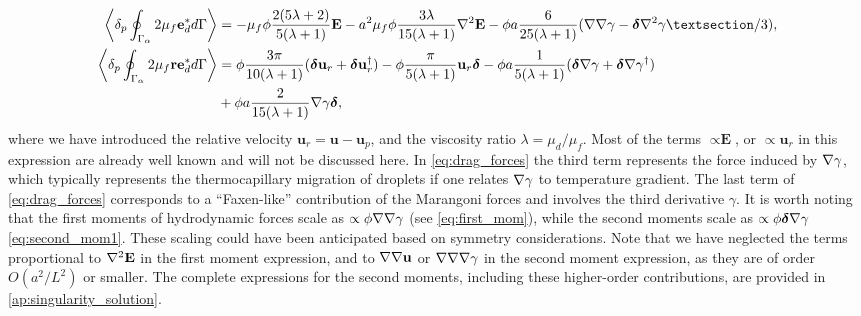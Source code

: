 \begin{align}
    \pSavg{ 2\mu_f \textbf{e}_d^*}
    &=
    -  \mu_f \phi \frac{2(5\lambda +2)}{5(\lambda+1)}\textbf{E}
    -  a^2 \mu_f \phi \frac{3\lambda}{15(\lambda+1)}\grad^2  \textbf{E}
    - \phi a  \frac{6}{25(\lambda+1)} (\grad\grad \gamma- \bm\delta\grad^2 \gamma§/3),\\
    \pSavg{ 2 \mu_f \textbf{re}_d^* }
    &=
    \phi \frac{3\pi}{10(\lambda+1)}
    (\bm\delta \textbf{u}_r +  \bm\delta\textbf{u}_r^\dagger)
    -\phi \frac{\pi}{5(\lambda+1)}\textbf{u}_r\bm\delta 
    -\phi a\frac{1}{5(\lambda+1)} (\bm\delta \grad \gamma+ \bm\delta\grad\gamma^\dagger)
    \nonumber \\&
    + \phi a\frac{2}{15(\lambda+1)}\grad\gamma\bm\delta,
    \label{eq:secondUN}
\end{align}
where we have introduced the relative velocity $\textbf{u}_r = \textbf{u} - \textbf{u}_p$, and the viscosity ratio $\lambda = \mu_d/\mu_f$. 
Most of the terms $\propto \textbf{E}$, or $\propto \textbf{u}_r$ in this expression are already well known and will not be discussed here.  
In \ref{eq:drag_forces} the third term represents the force induced by $\mathbf{\nabla} \gamma$, which typically represents the thermocapillary migration of droplets if one relates $\mathbf{\nabla}\gamma$ to temperature gradient.  
The last term of \ref{eq:drag_forces} corresponds to a ``Faxen-like'' contribution of the Marangoni forces and involves the third derivative $\gamma$.
It is worth noting that the first moments of hydrodynamic forces scale as $\propto \phi \mathbf{\nabla}\mathbf{\nabla} \gamma$ (see \ref{eq:first_mom}), while the second moments scale as $\propto \phi \bm\delta \mathbf{\nabla} \gamma$ \eqref{eq:second_mom1}.
These scaling could have been anticipated based on symmetry considerations. 
Note that we have neglected the terms proportional to $\mathbf{\nabla}^2 \textbf{E}$ in the first moment expression, and to $\mathbf{\nabla}\mathbf{\nabla} \textbf{u}$ or $\mathbf{\nabla}\mathbf{\nabla}\mathbf{\nabla} \gamma$ in the second moment expression, as they are of order $O(a^2/L^2)$ or smaller.
The complete expressions for the second moments, including these higher-order contributions, are provided in \ref{ap:singularity_solution}.

